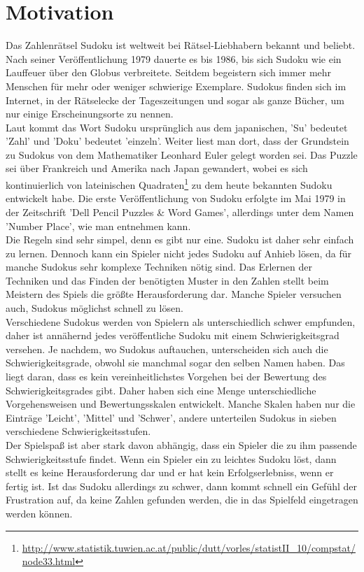 \section{Motivation}
Das Zahlenrätsel Sudoku ist weltweit bei Rätsel-Liebhabern bekannt und beliebt. Nach seiner Veröffentlichung 1979 dauerte es bis 1986, bis sich Sudoku wie ein Lauffeuer über den Globus verbreitete. Seitdem begeistern sich immer mehr Menschen für mehr oder weniger schwierige Exemplare. Sudokus finden sich im Internet, in der Rätselecke der Tageszeitungen und sogar als ganze Bücher, um nur einige Erscheinungsorte zu nennen. \\
Laut \cite{SuDra:2014:Misc} kommt das Wort Sudoku ursprünglich aus dem japanischen, 'Su' bedeutet 'Zahl' und 'Doku' bedeutet 'einzeln'. Weiter liest man dort, dass der Grundstein zu Sudokus von dem Mathematiker Leonhard Euler gelegt worden sei. Das Puzzle sei über Frankreich und Amerika nach Japan gewandert, wobei es sich kontinuierlich von lateinischen Quadraten\footnote{\url{http://www.statistik.tuwien.ac.at/public/dutt/vorles/statistII_10/compstat/node33.html}} zu dem heute bekannten Sudoku entwickelt habe. Die erste Veröffentlichung von Sudoku erfolgte im Mai 1979 in der Zeitschrift 'Dell Pencil Puzzles \& Word Games', allerdings unter dem Namen 'Number Place', wie man \cite{Wolf2014} entnehmen kann.\\
Die Regeln sind sehr simpel, denn es gibt nur eine. Sudoku ist daher sehr einfach zu lernen. Dennoch kann ein Spieler nicht jedes Sudoku auf Anhieb lösen, da für manche Sudokus sehr komplexe Techniken nötig sind. Das Erlernen der Techniken und das Finden der benötigten Muster in den Zahlen stellt beim Meistern des Spiels die größte Herausforderung dar. Manche Spieler versuchen auch, Sudokus möglichst schnell zu lösen.\\
Verschiedene Sudokus werden von Spielern als unterschiedlich schwer empfunden, daher ist annähernd jedes veröffentliche Sudoku mit einem Schwierigkeitsgrad versehen. Je nachdem, wo Sudokus auftauchen, unterscheiden sich auch die Schwierigkeitsgrade, obwohl sie manchmal sogar den selben Namen haben. Das liegt daran, dass es kein vereinheitlichstes Vorgehen bei der Bewertung des Schwierigkeitsgrades gibt. Daher haben sich eine Menge unterschiedliche Vorgehensweisen und Bewertungsskalen entwickelt. Manche Skalen haben nur die Einträge 'Leicht', 'Mittel' und 'Schwer', andere unterteilen Sudokus in sieben verschiedene Schwierigkeitsstufen.\\
Der Spielspaß ist aber stark davon abhängig, dass ein Spieler die zu ihm passende Schwierigkeitsstufe findet. Wenn ein Spieler ein zu leichtes Sudoku löst, dann stellt es keine Herausforderung dar und er hat kein Erfolgserlebniss, wenn er fertig ist. Ist das Sudoku allerdings zu schwer, dann kommt schnell ein Gefühl der Frustration auf, da keine Zahlen gefunden werden, die in das Spielfeld eingetragen werden können.\\
